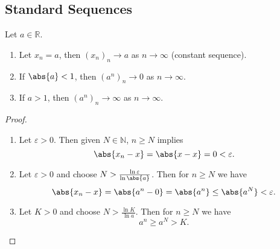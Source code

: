 \documentclass[../real_analysis.tex]{subfiles}
\begin{document}
        \subsection{Standard Sequences}\label{subsec:standard-sequences}
            \begin{theorem}\label{thm:std-seq}
                Let $a\in\mathbb{R}$.
                \begin{enumerate}[label={\upshape(\roman*)}]
                    \item Let $x_n=a$, then $(x_n)_n\to a$ as $n\to\infty$ (constant sequence).
                    \item If $\abs{a}<1$, then $(a^n)_n\to0$ as $n\to\infty$.
                    \item If $a>1$, then $(a^n)_n\to\infty$ as $n\to\infty$.
                \end{enumerate}
            \end{theorem}
            \begin{proof}
                \begin{enumerate}[label={\upshape(\roman*)}]
                    \item Let $\varepsilon>0$. Then given $N\in\mathbb{N}$, $n\geq N$ implies
                    \begin{equation}
                        \abs{x_n-x}=\abs{x-x}=0<\varepsilon.
                    \end{equation}
                    \item Let $\varepsilon>0$ and choose $N>\frac{\ln{\varepsilon}}{\ln{\abs{a}}}$. Then for $n\geq N$ we have
                    \begin{equation}
                        \abs{x_n-x}=\abs{a^n-0}=\abs{a^n}\leq\abs{a^N}<\varepsilon.
                    \end{equation}
                    \item Let $K>0$ and choose $N>\frac{\ln{K}}{\ln{a}}$. Then for $n\geq N$ we have
                    \begin{equation}
                        a^n\geq a^N>K.
                    \end{equation}
                \end{enumerate}
            \end{proof}
\end{document}
